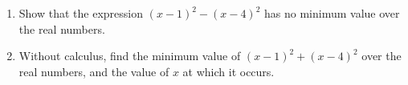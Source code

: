 \begin{enumerate}
\item Show that the expression $(x-1)^2-(x-4)^2$ has no minimum value over the real numbers.
\item Without calculus, find the minimum value of $(x-1)^2+(x-4)^2$ over the real numbers, and the value of $x$ at which it occurs.
\end{enumerate}
